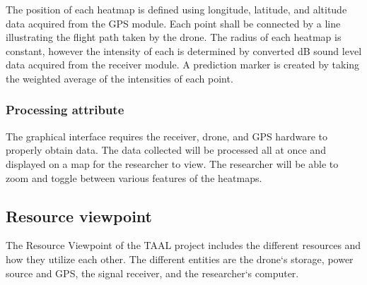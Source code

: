 \documentclass[onecolumn, draftclsnofoot,10pt, compsoc]{IEEEtran}
\begin{document}
The position of each heatmap is defined using longitude, latitude, and altitude data acquired from the GPS module.
Each point shall be connected by a line illustrating the flight path taken by the drone.
The radius of each heatmap is constant, however the intensity of each is determined by converted dB sound level data acquired from the receiver module.
A prediction marker is created by taking the weighted average of the intensities of each point.

\subsubsection{Processing attribute}
The graphical interface requires the receiver, drone, and GPS hardware to properly obtain data. The data collected will be processed all at once and displayed on a map for the researcher to view. The researcher will be able to zoom and toggle between various features of the heatmaps.

\subsection{Resource viewpoint}

The Resource Viewpoint of the TAAL project includes the different resources and how they utilize each other. The different entities are the drone`s storage, power source and GPS, the signal receiver, and the researcher`s computer.
\end{document}
